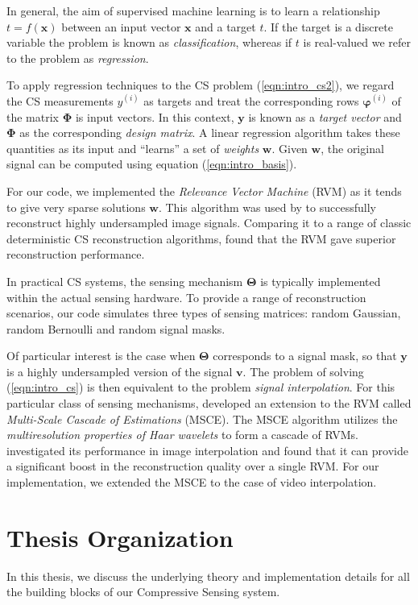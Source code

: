 In general, the aim of supervised machine learning is to learn a relationship $t = f(\bm x)$ between an input vector $\bm x$ and a target $t$.
If the target is a discrete variable the problem is known as \emph{classification}, whereas if $t$ is real-valued we refer to the problem as \emph{regression}.

To apply regression techniques to the CS problem (\ref{eqn:intro_cs2}), we regard the CS measurements $y^{(i)}$ as targets and treat the corresponding rows $\bm\varphi^{(i)}$ of the matrix $\bm\Phi$ is input vectors.
In this context, $\bm y$ is known as a \emph{target vector} and $\bm\Phi$ as the corresponding \emph{design matrix}.
A linear regression algorithm takes these quantities as its input and ``learns'' a set of \emph{weights} $\bm w$.
Given $\bm w$, the original signal can be computed using equation (\ref{eqn:intro_basis}).

For our code, we implemented the \emph{Relevance Vector Machine} (RVM) \cite{tipping2001,tipping2003} as it tends to give very sparse solutions $\bm w$.
This algorithm was used by \cite{pilikos2014} to successfully reconstruct highly undersampled image signals.
Comparing it to a range of classic deterministic CS reconstruction algorithms, \cite{pilikos2014} found that the RVM gave superior reconstruction performance.

In practical CS systems, the sensing mechanism $\bm\Theta$ is typically implemented within the actual sensing hardware.
To provide a range of reconstruction scenarios, our code simulates three types of sensing matrices: random Gaussian, random Bernoulli and random signal masks.

Of particular interest is the case when $\bm\Theta$ corresponds to a signal mask, so that $\bm y$ is a highly undersampled version of the signal $\bm v$.
The problem of solving (\ref{eqn:intro_cs}) is then equivalent to the problem \emph{signal interpolation}.
For this particular class of sensing mechanisms, \cite{pilikos2014} developed an extension to the RVM called \emph{Multi-Scale Cascade of Estimations} (MSCE).
The MSCE algorithm utilizes the \emph{multiresolution properties of Haar wavelets} to form a cascade of RVMs.
\cite{pilikos2014} investigated its performance in image interpolation and found that it can provide a significant boost in the reconstruction quality over a single RVM.
For our implementation, we extended the MSCE to the case of video interpolation.



\section*{Thesis Organization}
In this thesis, we discuss the underlying theory and implementation details for all the building blocks of our Compressive Sensing system.

